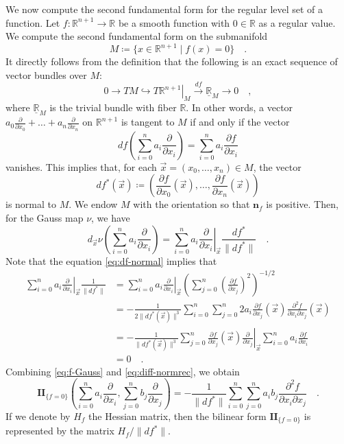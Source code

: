 \documentclass[pdftex,a4paper,12pt]{scrartcl}
\theoremstyle{plain}
\theoremstyle{definition}
\theoremstyle{remark}
\begin{document}
We now compute the second fundamental form for the regular level set of a function.
Let $f:\mathbb R^{n+1}\to\mathbb R$ be a smooth function with $0\in\mathbb R$ as a regular value.
We compute the second fundamental form on the submanifold
\[
M\coloneqq\{x\in\mathbb R^{n+1}\mid f(x)=0\}
\quad.
\]
It directly follows from the definition that the following is an exact sequence of vector bundles over $M$:
\[
0\to TM\hookrightarrow \left.T\mathbb R^{n+1}\right|_M \xrightarrow{df} \underline{\mathbb R}_M\to 0
\quad,
\]
where $\underline{\mathbb R}_M$ is the trivial bundle with fiber $\mathbb R$.
In other words, a vector $a_0\frac\partial{\partial x_0}+\dots+a_n\frac\partial{\partial x_n}$ on $\mathbb R^{n+1}$ is tangent to $M$ if and only if the vector
\begin{equation}
\label{eq:df-normal}
df\left(\sum_{i=0}^n a_i\frac\partial{\partial x_i}\right)
= \sum_{i=0}^n a_i\frac{\partial f}{\partial x_i}
\end{equation}
vanishes.
This implies that, for each $\vec x=(x_0,\dots,x_n)\in M$, the vector
\[
df^\ast(\vec x)
\coloneqq \left(\frac{\partial f}{\partial x_0}(\vec x),\dots,\frac{\partial f}{\partial x_n}(\vec x)\right)
\]
is normal to $M$.
We endow $M$ with the orientation so that $\mathbf n_f$ is positive.
Then, for the Gauss map $\nu$, we have
\begin{equation}
\label{eq:f-Gauss}
d_{\vec x}\nu\left(\sum_{i=0}^n a_i\frac\partial{\partial x_i}\right)
= \sum_{i=0}^n a_i \left.\frac{\partial}{\partial x_i}\right|_{\vec x} \frac{df^\ast}{\|df^\ast\|}
\quad.
\end{equation}
Note that the equation \eqref{eq:df-normal} implies that
\begin{equation}
\label{eq:diff-normrec}
\begin{split}
\sum_{i=0}^n a_i\left.\frac{\partial}{\partial x_i}\right|_{\vec x}
\frac1{\|df^\ast\|}
&= \sum_{i=0}^n a_i\left.\frac{\partial}{\partial x_i}\right|_{\vec x}\left(\sum_{j=0}^n\left(\frac{\partial f}{\partial x_j}\right)^2\right)^{-1/2} \\
& = -\frac1{2\|df^\ast(\vec x)\|^3} \sum_{i=0}^n\sum_{j=0}^n 2a_i\frac{\partial f}{\partial x_j}(\vec x)\frac{\partial^2f}{\partial x_i\partial x_j}(\vec x) \\
& = -\frac1{\|df^\ast(\vec x)\|^3}\sum_{j=0}^n \frac{\partial f}{\partial x_j}(\vec x)\left.\frac{\partial}{\partial x_j}\right|_{\vec x} \sum_{i=0}^n a_i\frac{\partial f}{\partial x_i} \\
& = 0
\quad.
\end{split}
\end{equation}
Combining \eqref{eq:f-Gauss} and \eqref{eq:diff-normrec}, we obtain
\begin{equation}
\label{eq:f-II-form}
\mathbf{II}_{\{f=0\}}\left(\sum_{i=0}^na_i\frac{\partial}{\partial x_i},\sum_{j=0}^nb_j\frac\partial{\partial x_j}\right)
= -\frac{1}{\|df^\ast\|}\sum_{i=0}^n\sum_{j=0}^n a_ib_j\frac{\partial^2f }{\partial x_i\partial x_j}
\quad.
\end{equation}
If we denote by $H_f$ the Hessian matrix, then the bilinear form $\mathbf{II}_{\{f=0\}}$ is represented by the matrix $H_f/\|df^\ast\|$.
\end{document}
